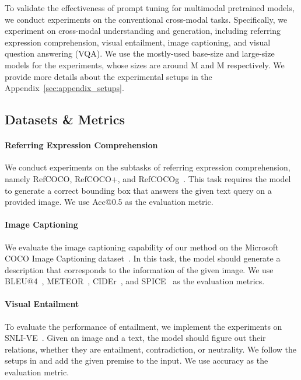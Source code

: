 \documentclass[11pt]{article}
\begin{document}
 
    






 To validate the effectiveness of prompt tuning for multimodal pretrained models, we conduct experiments on the conventional cross-modal tasks. 
Specifically, we experiment on cross-modal understanding and generation, including referring expression comprehension, visual entailment, image captioning, and visual question answering (VQA). 
We use the mostly-used base-size and large-size models for the experiments, whose sizes are around M and M respectively. We provide more details about the experimental setups in the Appendix~\ref{sec:appendix_setups}. 


\subsection{Datasets \& Metrics}
\paragraph{Referring Expression Comprehension} 
We conduct experiments on the  subtasks of referring expression comprehension, namely RefCOCO, RefCOCO+, and RefCOCOg~\citep{refcoco, refcocog}. 
This task requires the model to generate a correct bounding box that answers the given text query on a provided image. 
We use Acc@0.5 as the evaluation metric. 

\paragraph{Image Captioning}
We evaluate the image captioning capability of our method on the Microsoft COCO Image Captioning dataset~\citep{coco_cap}. 
In this task, the model should generate a description that corresponds to the information of the given image. 
We use BLEU@4~\citep{bleu}, METEOR~\citep{meteor}, CIDEr~\citep{cider}, and SPICE~\citep{spice} as the evaluation metrics. 

\paragraph{Visual Entailment}
To evaluate the performance of entailment, we implement the experiments on SNLI-VE~\citep{snli-ve}. 
Given an image and a text, the model should figure out their relations, whether they are entailment, contradiction, or neutrality. 
We follow the setups in \citep{ofa} and add the given premise to the input. We use accuracy as the evaluation metric. 
\end{document}
